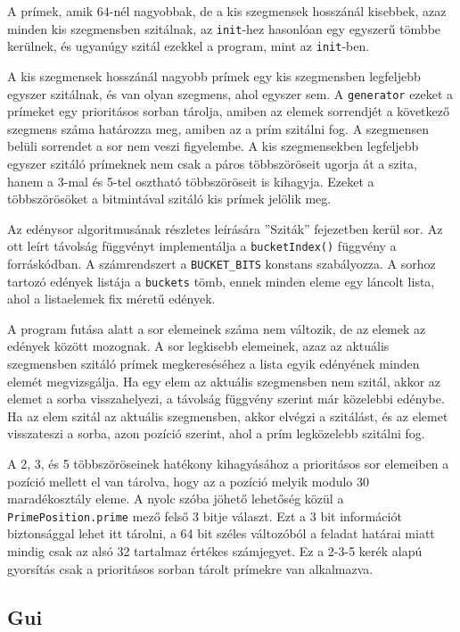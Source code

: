 A prímek, amik $64$-nél nagyobbak, de a kis szegmensek hosszánál kisebbek, azaz minden kis szegmensben szitálnak, az \texttt{init}-hez hasonlóan egy egyszerű tömbbe kerülnek, és ugyanúgy szitál ezekkel a program, mint az \texttt{init}-ben.

A kis szegmensek hosszánál nagyobb prímek egy kis szegmensben legfeljebb egyszer szitálnak, és van olyan szegmens, ahol egyszer sem.
A \texttt{generator} ezeket a prímeket egy prioritásos sorban tárolja, amiben az elemek sorrendjét a következő szegmens száma határozza meg, amiben az a prím szitálni fog.
A szegmensen belüli sorrendet a sor nem veszi figyelembe.
A kis szegmensekben legfeljebb egyszer szitáló prímeknek nem csak a páros többszöröseit ugorja át a szita, hanem a 3-mal és 5-tel osztható többszöröseit is kihagyja.
Ezeket a többszörösöket a bitmintával szitáló kis prímek jelölik meg.

Az edénysor algoritmusának részletes leírására ''Sziták'' fejezetben kerül sor.
Az ott leírt távolság függvényt implementálja a \texttt{bucketIndex()} függvény a forráskódban.
A számrendszert a \texttt{BUCKET\_BITS} konstans szabályozza.
A sorhoz tartozó edények listája a \texttt{buckets} tömb, ennek minden eleme egy láncolt lista, ahol a listaelemek fix méretű edények.

A program futása alatt a sor elemeinek száma nem változik, de az elemek az edények között mozognak.
A sor legkisebb elemeinek, azaz az aktuális szegmensben szitáló prímek megkereséséhez a lista egyik edényének minden elemét megvizsgálja.
Ha egy elem az aktuális szegmensben nem szitál, akkor az elemet a sorba visszahelyezi, a távolság függvény szerint már közelebbi edénybe.
Ha az elem szitál az aktuális szegmensben, akkor elvégzi a szitálást, és az elemet visszateszi a sorba, azon pozíció szerint, ahol a prím legközelebb szitálni fog.

A 2, 3, és 5 többszöröseinek hatékony kihagyásához a prioritásos sor elemeiben a pozíció mellett el van tárolva, hogy az a pozíció melyik modulo $30$ maradékosztály eleme.
A nyolc szóba jöhető lehetőség közül a \texttt{PrimePosition.prime} mező felső 3 bitje választ.
Ezt a 3 bit információt biztonsággal lehet itt tárolni, a 64 bit széles változóból a feladat határai miatt mindig csak az alsó 32 tartalmaz értékes számjegyet.
Ez a 2-3-5 kerék alapú gyorsítás csak a prioritásos sorban tárolt prímekre van alkalmazva.

\subsection{Gui}

